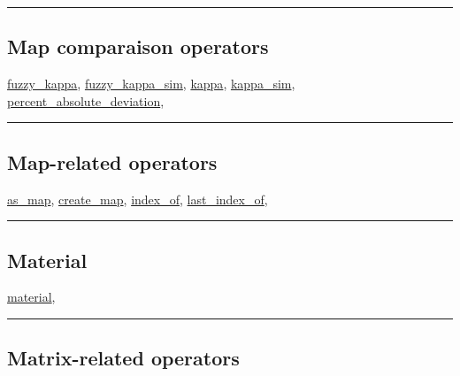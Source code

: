 \documentclass[]{book}
\theoremstyle{definition}
\theoremstyle{definition}
\theoremstyle{definition}
\theoremstyle{remark}
\begin{document}
\begin{center}\rule{0.5\linewidth}{\linethickness}\end{center}

\subsection{Map comparaison operators}\label{map-comparaison-operators}

\href{operators-d-to-h.html\#fuzzy_kappa}{fuzzy\_kappa},
\href{operators-d-to-h.html\#fuzzy_kappa_sim}{fuzzy\_kappa\_sim},
\href{operators-i-to-m.html\#kappa}{kappa},
\href{operators-i-to-m.html\#kappa_sim}{kappa\_sim},
\href{operators-n-to-r.html\#percent_absolute_deviation}{percent\_absolute\_deviation},

\begin{center}\rule{0.5\linewidth}{\linethickness}\end{center}

\subsection{Map-related operators}\label{map-related-operators}

\href{operators-a-to-a.html\#as_map}{as\_map},
\href{operators-b-to-c.html\#create_map}{create\_map},
\href{operators-i-to-m.html\#index_of}{index\_of},
\href{operators-i-to-m.html\#last_index_of}{last\_index\_of},

\begin{center}\rule{0.5\linewidth}{\linethickness}\end{center}

\subsection{Material}\label{material}

\href{operators-i-to-m.html\#material}{material},

\begin{center}\rule{0.5\linewidth}{\linethickness}\end{center}

\subsection{Matrix-related operators}\label{matrix-related-operators}
\end{document}
